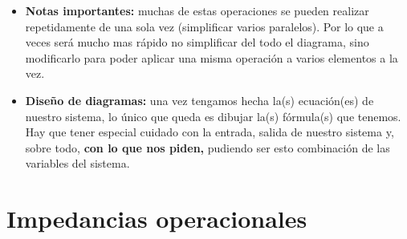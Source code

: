 \documentclass[a4paper, twocolumn, 10pt]{article}
\begin{document}
\begin{itemize}
	\item \textbf{Notas importantes:} muchas de estas operaciones se pueden realizar repetidamente de una sola vez (simplificar varios paralelos). Por lo que a veces será mucho mas rápido no simplificar del todo el diagrama, sino modificarlo para poder aplicar una misma operación a varios elementos a la vez.
	
	\item \textbf{Diseño de diagramas:} una vez tengamos hecha la(s) ecuación(es) de nuestro sistema, lo único que queda es dibujar la(s) fórmula(s) que tenemos. Hay que tener especial cuidado con la entrada, salida de nuestro sistema y, sobre todo, \textbf{con lo que nos piden,} pudiendo ser esto combinación de las variables del sistema.
	
\end{itemize}

\section{Impedancias operacionales}
\end{document}
